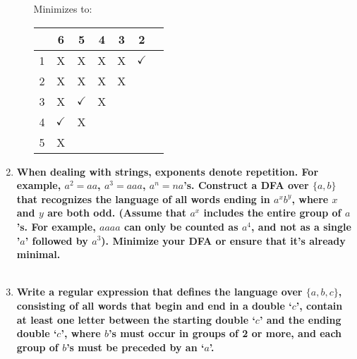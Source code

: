 \begin{enumerate}
\begin{enumerate}

Minimizes to:
\begin{table}[]
	\begin{tabular}{|c|c|c|c|c|c|c}
		\hline
		&  6 & 5 &  4 & 3  &   2 \\ \hline
		1 & X & X & X & X & $\checkmark$ \\ \hline
		2  &  X  & X & X & X \\ \hline
		3  & X & $\checkmark$ &  X\\ \hline
		4  &  $\checkmark$ & X \\ \hline
        5  & X \\ \hline
	\end{tabular}
\end{table}


\end{enumerate}

\newpage
\item \textbf{When dealing with strings, exponents denote repetition. For
  example, $a^2=aa$, $a^3=aaa$, $a^n= n a$'s.  Construct a DFA over
  $\{a,b\}$ that recognizes the language of all words ending in $a^xb^y$,
  where $x$ and $y$ are both odd. (Assume that $a^x$ includes the entire group
  of $a$'s.  For example, $aaaa$ can only be counted as $a^4$, and not as a
  single '$a$' followed by $a^3$). Minimize your DFA or ensure that it's
  already minimal.}
\\\\


\newpage
\item \textbf{Write a regular expression that defines the language over
  $\{a,b,c\}$, consisting of all words that begin and end in a double ‘$c$’, contain at least one letter between the starting double ‘$c$’ and the ending double ‘$c$’, where $b$’s must occur in groups of 2  or more, and each group of $b$’s must be preceded by an ‘$a$’.}
\\\\


\end{enumerate}
